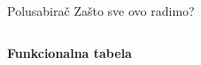 \begin{frame}[label=05-s015]{Polusabirač}
\alert{Zašto sve ovo radimo?}
\medskip
\begin{columns}[c,onlytextwidth]
\centering\textbf{Funkcionalna tabela}\par\vspace{3mm}
\renewcommand{\arraystretch}{1.6}\setlength{\tabcolsep}{11pt}
\centering
\end{columns}
\end{frame}
